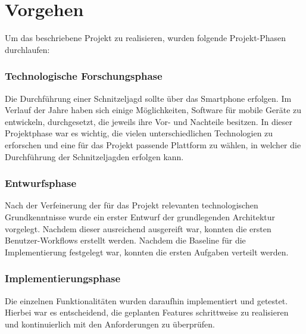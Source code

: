 \section{Vorgehen}

Um das beschriebene Projekt zu realisieren, wurden folgende Projekt-Phasen durchlaufen:

\subsubsection{Technologische Forschungsphase}

Die Durchführung einer Schnitzeljagd sollte über das Smartphone erfolgen. Im Verlauf der Jahre haben sich einige Möglichkeiten, Software für mobile Geräte zu entwickeln, durchgesetzt, die jeweils ihre Vor- und Nachteile besitzen. In dieser Projektphase war es wichtig, die vielen unterschiedlichen Technologien zu erforschen und eine für das Projekt passende Plattform zu wählen, in welcher die Durchführung der Schnitzeljagden erfolgen kann.

\subsubsection{Entwurfsphase}

Nach der Verfeinerung der für das Projekt relevanten technologischen Grundkenntnisse wurde ein erster Entwurf der grundlegenden Architektur vorgelegt. Nachdem dieser ausreichend ausgereift war, konnten die ersten Benutzer-Workflows erstellt werden. Nachdem die Baseline für die Implementierung festgelegt war, konnten die ersten Aufgaben verteilt werden.

\subsubsection{Implementierungsphase}

Die einzelnen Funktionalitäten wurden daraufhin implementiert und getestet. Hierbei war es entscheidend, die geplanten Features schrittweise zu realisieren und kontinuierlich mit den Anforderungen zu überprüfen.
